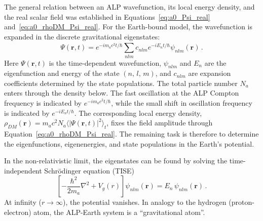 The general relation between an ALP wavefunction, its local energy density, and the real scalar field was established in Equations~\eqref{eq:a0_Psi_real} and~\eqref{eq:a0_rhoDM_Psi_real}.
For the Earth-bound model, the wavefunction is expanded in the discrete gravitational eigenstates:
\begin{equation}
    \Psi(\boldsymbol{r}, t) = e^{-i m_a c^2 t / \hbar}\sum_{nlm}^{} c_{nlm} e^{-i E_n t / \hbar} \psi_{nlm}(\boldsymbol{r})
    \,.
    \label{eq:Psi_r_t}
\end{equation}
Here $\Psi(\boldsymbol{r}, t)$ is the time-dependent wavefunction, $\psi_{nlm}$ and $E_n$ are the eigenfunction and energy of the state $(n,\,l,\,m)$, and $c_{nlm}$ are expansion coefficients determined by the state populations.
The total particle number $N_a$ enters through the density below.
The fast oscillation at the ALP Compton frequency is indicated by $e^{-i m_a c^2 t / \hbar}$, while the small shift in oscillation frequency is indicated by $e^{-i E_n t / \hbar}$.
The corresponding local energy density, $\rho_{DM}(\boldsymbol{r})=m_a c^2N_a
\langle|\Psi(\boldsymbol{r},t)|^2\rangle_t$, fixes the field amplitude through
Equation~\eqref{eq:a0_rhoDM_Psi_real}.
The remaining task is therefore to determine the eigenfunctions, eigenenergies, and state populations in the Earth's potential.

In the non-relativistic limit, the eigenstates can be found by solving the time-independent Schrödinger equation (TISE)
\begin{equation}
    \left[-\frac{\hbar^2}{2 m_a}\nabla^2 + V_g(r)\right]\psi_{nlm}(\boldsymbol{r})
    = E_n\,\psi_{nlm}(\boldsymbol{r})
    \,.\label{eq:schrodinger_earth}
\end{equation}
At infinity ($r \to \infty$), the potential vanishes.
In analogy to the hydrogen (proton-electron) atom, the ALP-Earth system is a ``gravitational atom''.


